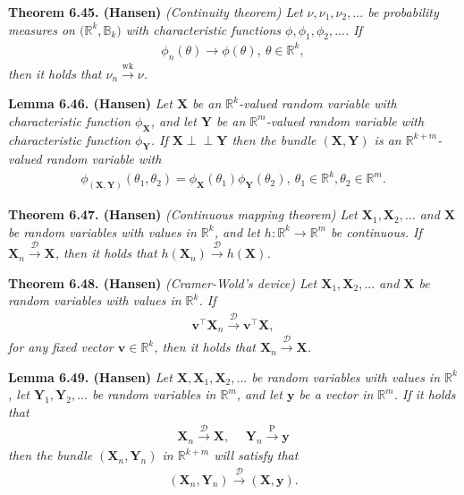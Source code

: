 \documentclass[
]{book}
\begin{document}
\textbf{Theorem 6.45. (Hansen)} \emph{(Continuity theorem) Let \(\nu,\nu_1,\nu_2,...\) be probability measures on \(\big(\mathbb{R}^k,\mathbb{B}_k\big)\) with characteristic functions \(\phi,\phi_1,\phi_2,...\). If}
\begin{align*}
    \phi_n(\theta)\to \phi(\theta),\ \theta\in\mathbb{R}^k,\tag{6.47}
\end{align*}
\emph{then it holds that \(\nu_n\stackrel{\text{wk}}{\to}\nu\).}

\textbf{Lemma 6.46. (Hansen)} \emph{Let \(\mathbf{X}\) be an \(\mathbb{R}^k\)-valued random variable with characteristic function \(\phi_\mathbf{X}\), and let \(\mathbf{Y}\) be an \(\mathbb{R}^m\)-valued random variable with characteristic function \(\phi_\mathbf{Y}\). If \(\mathbf{X} \perp \!\!\! \perp \mathbf{Y}\) then the bundle \((\mathbf{X},\mathbf{Y})\) is an \(\mathbb{R}^{k+m}\)-valued random variable with}
\begin{align*}
    \phi_{(\mathbf{X},\mathbf{Y})}(\theta_1,\theta_2)=\phi_\mathbf{X}(\theta_1)\phi_\mathbf{Y}(\theta_2),\ \theta_1\in\mathbb{R}^k,\theta_2\in\mathbb{R}^m.\tag{6.49}
\end{align*}

\textbf{Theorem 6.47. (Hansen)} \emph{(Continuous mapping theorem) Let \(\mathbf{X}_1,\mathbf{X}_2,...\) and \(\mathbf{X}\) be random variables with values in \(\mathbb{R}^k\), and let \(h : \mathbb{R}^k\to\mathbb{R}^m\) be continuous. If \(\mathbf{X}_n\stackrel{\mathcal{D}}{\to} \mathbf{X}\), then it holds that \(h(\mathbf{X}_n)\stackrel{\mathcal{D}}{\to} h(\mathbf{X})\).}

\textbf{Theorem 6.48. (Hansen)} \emph{(Cramer-Wold's device) Let \(\mathbf{X}_1,\mathbf{X}_2,...\) and \(\mathbf{X}\) be random variables with values in \(\mathbb{R}^k\). If}
\begin{align*}
    \mathbf{v}^\top\mathbf{X}_n\stackrel{\mathcal{D}}{\to} \mathbf{v}^\top\mathbf{X},\tag{6.51}
\end{align*}
\emph{for any fixed vector \(\mathbf{v}\in\mathbb{R}^k\), then it holds that \(\mathbf{X}_n\stackrel{\mathcal{D}}{\to} \mathbf{X}\).}

\textbf{Lemma 6.49. (Hansen)} \emph{Let \(\mathbf{X},\mathbf{X}_1,\mathbf{X}_2,...\) be random variables with values in \(\mathbb{R}^k\), let \(\mathbf{Y}_1,\mathbf{Y}_2,...\) be random variables in \(\mathbb{R}^m\), and let \(\mathbf{y}\) be a vector in \(\mathbb{R}^m\). If it holds that}
\begin{align*}
    \mathbf{X}_n\stackrel{\mathcal{D}}{\to} \mathbf{X},\hspace{15pt}\mathbf{Y}_n\stackrel{\text{P}}{\to} \mathbf{y}
\end{align*}
\emph{then the bundle \((\mathbf{X}_n,\mathbf{Y}_n)\) in \(\mathbb{R}^{k+m}\) will satisfy that}
\begin{align*}
    (\mathbf{X}_n,\mathbf{Y}_n)\stackrel{\mathcal{D}}{\to} (\mathbf{X},\mathbf{y}).
\end{align*}
\end{document}

